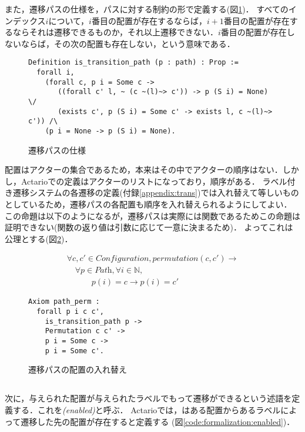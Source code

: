 また，遷移パスの仕様を，パスに対する制約の形で定義する(図\ref{code:formalization:path-spec})．
すべてのインデックス$i$について，$i$番目の配置が存在するならば，$i+1$番目の配置が存在するならそれは遷移できるものか，それ以上遷移できない．$i$番目の配置が存在しないならば，その次の配置も存在しない，という意味である．

\begin{figure}[tp]
\begin{lstlisting}
Definition is_transition_path (p : path) : Prop :=
  forall i,
    (forall c, p i = Some c ->
       ((forall c' l, ~ (c ~(l)~> c')) -> p (S i) = None) \/
       (exists c', p (S i) = Some c' -> exists l, c ~(l)~> c')) /\
    (p i = None -> p (S i) = None).
\end{lstlisting}
  \label{code:formalization:path-spec}
  \caption{遷移パスの仕様}
\end{figure}

配置はアクターの集合であるため，本来はその中でアクターの順序はない．しかし，Actarioでの定義はアクターのリストになっており，順序がある．
ラベル付き遷移システムの各遷移の定義(付録\ref{appendix:trans})では入れ替えて等しいものとしているため，遷移パスの各配置も順序を入れ替えられるようにしてよい．
この命題は以下のようになるが，遷移パスは実際には関数であるためこの命題は証明できない(関数の返り値は引数に応じて一意に決まるため)．
よってこれは公理とする(図\ref{code:proof:path-perm})．

\begin{displaymath}
  \begin{array}{l}
    \forall c, c' \in \textit{Configuration}, permutation(c, c') \rightarrow \\
    \quad \forall p \in \textit{Path}, \forall i \in \mathbb{N}, \\
    \quad \quad \quad p(i) = c \rightarrow p(i) = c'
  \end{array}
\end{displaymath}

\begin{figure}[tp]
\begin{lstlisting}
Axiom path_perm :
  forall p i c c',
    is_transition_path p ->
    Permutation c c' ->
    p i = Some c ->
    p i = Some c'.
\end{lstlisting}
  \label{code:proof:path-perm}
  \caption{遷移パスの配置の入れ替え}
\end{figure}

\subsection{\enabled}
次に，与えられた配置が与えられたラベルでもって遷移ができるという述語を定義する．これを\emph{\enabled (enabled)}と呼ぶ．
Actarioでは，\enabled はある配置からあるラベルによって遷移した先の配置が存在すると定義する (図\ref{code:formalization:enabled})．

